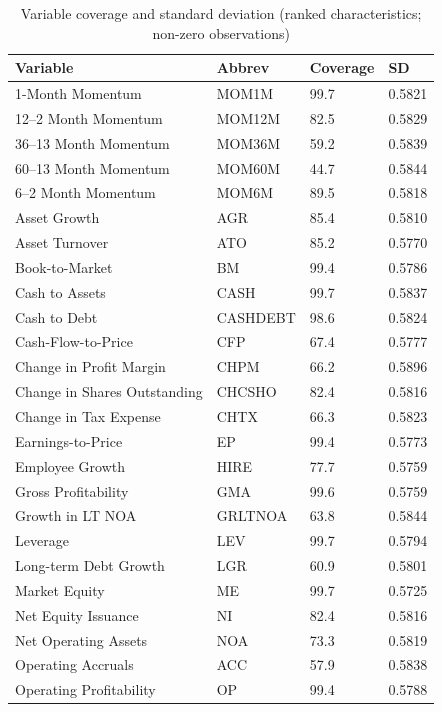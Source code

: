 \begin{table}[ht]
\centering
\caption{Variable coverage and standard deviation (ranked characteristics; non-zero observations)} 
\label{tab:variable_stats}
\begin{tabular}{llll}
  \hline
Variable & Abbrev & Coverage & SD \\ 
  \hline
1-Month Momentum & MOM1M & 99.7 & 0.5821 \\ 
  12–2 Month Momentum & MOM12M & 82.5 & 0.5829 \\ 
  36–13 Month Momentum & MOM36M & 59.2 & 0.5839 \\ 
  60–13 Month Momentum & MOM60M & 44.7 & 0.5844 \\ 
  6–2 Month Momentum & MOM6M & 89.5 & 0.5818 \\ 
  Asset Growth & AGR & 85.4 & 0.5810 \\ 
  Asset Turnover & ATO & 85.2 & 0.5770 \\ 
  Book-to-Market & BM & 99.4 & 0.5786 \\ 
  Cash to Assets & CASH & 99.7 & 0.5837 \\ 
  Cash to Debt & CASHDEBT & 98.6 & 0.5824 \\ 
  Cash-Flow-to-Price & CFP & 67.4 & 0.5777 \\ 
  Change in Profit Margin & CHPM & 66.2 & 0.5896 \\ 
  Change in Shares Outstanding & CHCSHO & 82.4 & 0.5816 \\ 
  Change in Tax Expense & CHTX & 66.3 & 0.5823 \\ 
  Earnings-to-Price & EP & 99.4 & 0.5773 \\ 
  Employee Growth & HIRE & 77.7 & 0.5759 \\ 
  Gross Profitability & GMA & 99.6 & 0.5759 \\ 
  Growth in LT NOA & GRLTNOA & 63.8 & 0.5844 \\ 
  Leverage & LEV & 99.7 & 0.5794 \\ 
  Long-term Debt Growth & LGR & 60.9 & 0.5801 \\ 
  Market Equity & ME & 99.7 & 0.5725 \\ 
  Net Equity Issuance & NI & 82.4 & 0.5816 \\ 
  Net Operating Assets & NOA & 73.3 & 0.5819 \\ 
  Operating Accruals & ACC & 57.9 & 0.5838 \\ 
  Operating Profitability & OP & 99.4 & 0.5788 \\ 

\end{tabular}
\end{table}
